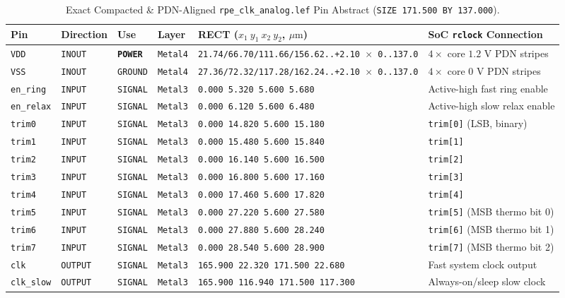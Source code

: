 \documentclass[10pt,a4paper]{article}
\begin{document}
\begin{table}[H]
\centering
\vspace{-4pt}
\caption{Exact Compacted \& PDN-Aligned \texttt{rpe\_clk\_analog.lef} Pin Abstract (\texttt{SIZE 171.500 BY 137.000}).}
\label{tab:lef_pins}
\scriptsize
\setlength{\tabcolsep}{4pt}
\renewcommand{\arraystretch}{0.72}
\begin{tabular}{@{}llllll@{}}
\toprule
\textbf{Pin} & \textbf{Direction} & \textbf{Use} & \textbf{Layer} & \textbf{RECT ($x_1\ y_1\ x_2\ y_2$, $\mu\text{m}$)} & \textbf{SoC \texttt{rclock} Connection} \\
\midrule
\texttt{VDD} & \texttt{INOUT} & \textbf{\texttt{POWER}} & \texttt{Metal4} & \texttt{21.74/66.70/111.66/156.62..+2.10 $\times$ 0..137.0} & $4\times$ core $1.2\text{ V}$ PDN stripes \\
\texttt{VSS} & \texttt{INOUT} & \texttt{GROUND} & \texttt{Metal4} & \texttt{27.36/72.32/117.28/162.24..+2.10 $\times$ 0..137.0} & $4\times$ core $0\text{ V}$ PDN stripes \\
\texttt{en\_ring} & \texttt{INPUT} & \texttt{SIGNAL} & \texttt{Metal3} & \texttt{0.000 5.320 5.600 5.680} & Active-high fast ring enable \\
\texttt{en\_relax} & \texttt{INPUT} & \texttt{SIGNAL} & \texttt{Metal3} & \texttt{0.000 6.120 5.600 6.480} & Active-high slow relax enable \\
\texttt{trim0} & \texttt{INPUT} & \texttt{SIGNAL} & \texttt{Metal3} & \texttt{0.000 14.820 5.600 15.180} & \texttt{trim[0]} (LSB, binary) \\
\texttt{trim1} & \texttt{INPUT} & \texttt{SIGNAL} & \texttt{Metal3} & \texttt{0.000 15.480 5.600 15.840} & \texttt{trim[1]} \\
\texttt{trim2} & \texttt{INPUT} & \texttt{SIGNAL} & \texttt{Metal3} & \texttt{0.000 16.140 5.600 16.500} & \texttt{trim[2]} \\
\texttt{trim3} & \texttt{INPUT} & \texttt{SIGNAL} & \texttt{Metal3} & \texttt{0.000 16.800 5.600 17.160} & \texttt{trim[3]} \\
\texttt{trim4} & \texttt{INPUT} & \texttt{SIGNAL} & \texttt{Metal3} & \texttt{0.000 17.460 5.600 17.820} & \texttt{trim[4]} \\
\texttt{trim5} & \texttt{INPUT} & \texttt{SIGNAL} & \texttt{Metal3} & \texttt{0.000 27.220 5.600 27.580} & \texttt{trim[5]} (MSB thermo bit 0) \\
\texttt{trim6} & \texttt{INPUT} & \texttt{SIGNAL} & \texttt{Metal3} & \texttt{0.000 27.880 5.600 28.240} & \texttt{trim[6]} (MSB thermo bit 1) \\
\texttt{trim7} & \texttt{INPUT} & \texttt{SIGNAL} & \texttt{Metal3} & \texttt{0.000 28.540 5.600 28.900} & \texttt{trim[7]} (MSB thermo bit 2) \\
\texttt{clk} & \texttt{OUTPUT} & \texttt{SIGNAL} & \texttt{Metal3} & \texttt{165.900 22.320 171.500 22.680} & Fast system clock output \\
\texttt{clk\_slow} & \texttt{OUTPUT} & \texttt{SIGNAL} & \texttt{Metal3} & \texttt{165.900 116.940 171.500 117.300} & Always-on/sleep slow clock \\
\bottomrule
\end{tabular}
\end{table}
\end{document}
